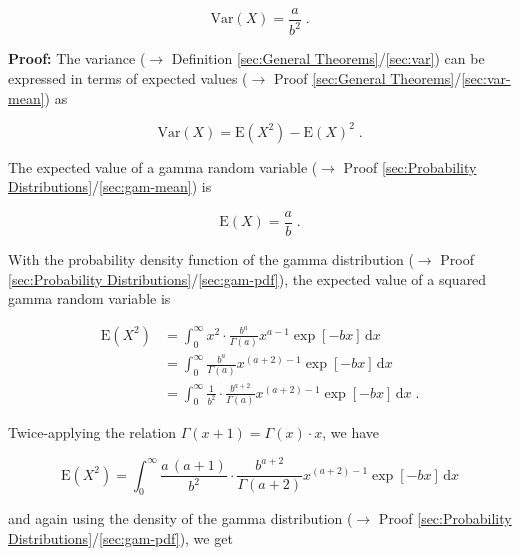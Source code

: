 \documentclass[a4paper,12pt,twoside]{book}
\begin{document}
\begin{equation} \label{eq:gam-var-gam-var}
\mathrm{Var}(X) = \frac{a}{b^2} \; .
\end{equation}


\vspace{1em}
\textbf{Proof:} The variance ($\rightarrow$ Definition \ref{sec:General Theorems}/\ref{sec:var}) can be expressed in terms of expected values ($\rightarrow$ Proof \ref{sec:General Theorems}/\ref{sec:var-mean}) as

\begin{equation} \label{eq:gam-var-var-mean}
\mathrm{Var}(X) = \mathrm{E}(X^2) - \mathrm{E}(X)^2 \; .
\end{equation}

The expected value of a gamma random variable ($\rightarrow$ Proof \ref{sec:Probability Distributions}/\ref{sec:gam-mean}) is

\begin{equation} \label{eq:gam-var-gam-mean}
\mathrm{E}(X) = \frac{a}{b} \; .
\end{equation}

With the probability density function of the gamma distribution ($\rightarrow$ Proof \ref{sec:Probability Distributions}/\ref{sec:gam-pdf}), the expected value of a squared gamma random variable is

\begin{equation} \label{eq:gam-var-gam-sqr-mean-s1}
\begin{split}
\mathrm{E}(X^2) &= \int_{0}^{\infty} x^2 \cdot \frac{b^a}{\Gamma(a)} x^{a-1} \exp[-b x] \, \mathrm{d}x \\
&= \int_{0}^{\infty} \frac{b^a}{\Gamma(a)} x^{(a+2)-1} \exp[-b x] \, \mathrm{d}x \\
&= \int_{0}^{\infty} \frac{1}{b^2} \cdot \frac{b^{a+2}}{\Gamma(a)} x^{(a+2)-1} \exp[-b x] \, \mathrm{d}x \; .
\end{split}
\end{equation}

Twice-applying the relation $\Gamma(x+1) = \Gamma(x) \cdot x$, we have

\begin{equation} \label{eq:gam-var-gam-sqr-mean-s2}
\mathrm{E}(X^2) = \int_{0}^{\infty} \frac{a \, (a+1)}{b^2} \cdot \frac{b^{a+2}}{\Gamma(a+2)} x^{(a+2)-1} \exp[-b x] \, \mathrm{d}x
\end{equation}

and again using the density of the gamma distribution ($\rightarrow$ Proof \ref{sec:Probability Distributions}/\ref{sec:gam-pdf}), we get
\end{document}
